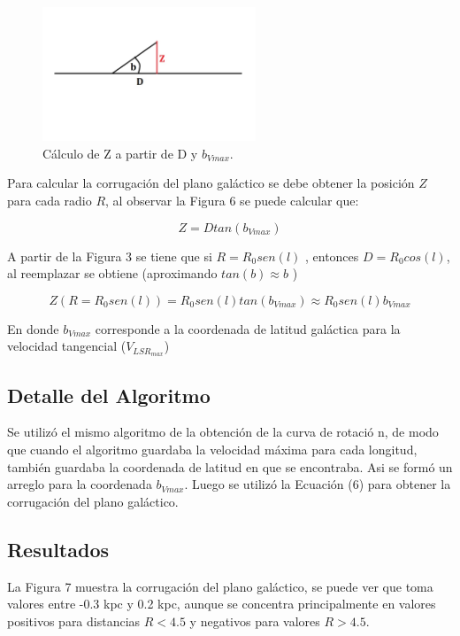 \documentclass[letterpaper,oneside]{article}
\begin{document}
\begin{figure}
  \centering
  \includegraphics[height=4cm]{../graficos/imagenes/Corrugacion.jpg}
  \caption{Cálculo de Z a partir de D y $b_{Vmax}$.}
\end{figure}

Para calcular la corrugación del plano galáctico se debe obtener la posición $Z$ para cada radio $R$, al observar la Figura 6 se puede calcular que:

$$Z = D tan(b_{Vmax})$$

A partir de la Figura 3 se tiene que si $R = R_0 sen(l)$ , entonces $D = R_0 cos(l)$, al reemplazar se obtiene (aproximando $tan(b) \approx b $ )

\begin{equation}
    Z(R=R_0 sen(l)) = R_0 sen(l) tan(b_{Vmax}) \approx R_0 sen(l) b_{Vmax}
\end{equation}

En donde $b_{Vmax}$ corresponde a la coordenada de latitud galáctica para la velocidad tangencial ($V_{LSR}_{max}$)

\subsection{Detalle del Algoritmo}
Se utilizó el mismo algoritmo de la obtención de la curva de rotació
n, de modo que cuando el algoritmo guardaba la velocidad máxima para cada longitud, también guardaba la coordenada de latitud en que se encontraba. Asi se formó un arreglo para la coordenada $b_{Vmax}$. Luego se utilizó la Ecuación (6) para obtener la corrugación del plano galáctico.

\subsection{Resultados}
La Figura 7 muestra la corrugación del plano galáctico, se puede ver que toma valores entre -0.3 kpc y 0.2 kpc, aunque se concentra principalmente en valores positivos para distancias $R<4.5$ y negativos para valores $R>4.5$.
\end{document}

